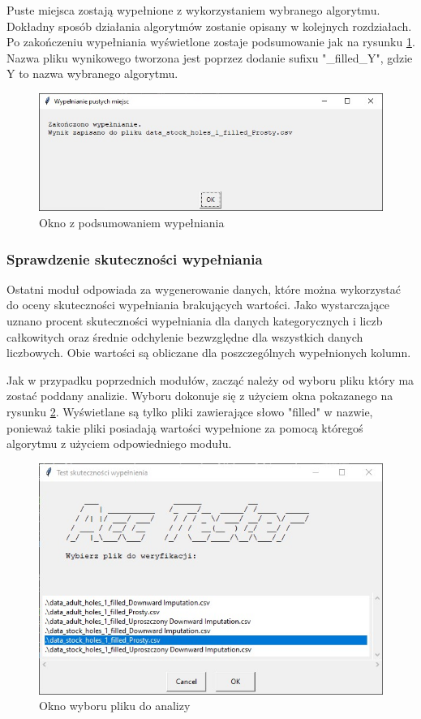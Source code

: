 \documentclass[12pt,twoside]{article}
\begin{document}
Puste miejsca zostają wypełnione z wykorzystaniem wybranego algorytmu.
Dokładny sposób działania algorytmów zostanie opisany w kolejnych rozdziałach.
Po zakończeniu wypełniania wyświetlone zostaje podsumowanie jak na rysunku \ref{Fig:fill_end}.
Nazwa pliku wynikowego tworzona jest poprzez dodanie sufixu "\_filled\_Y", gdzie Y to nazwa wybranego algorytmu.

\begin{figure}[ht]
	\centering
	\includegraphics[width=12cm]{img/07.jpg}
	\caption{Okno z podsumowaniem wypełniania}
\label{Fig:fill_end}
\end{figure}

\subsubsection{Sprawdzenie skuteczności wypełniania}

Ostatni moduł odpowiada za wygenerowanie danych,
które można wykorzystać do oceny skuteczności wypełniania brakujących wartości.
Jako wystarczające uznano procent skuteczności wypełniania dla danych kategorycznych i liczb całkowitych
oraz średnie odchylenie bezwzględne dla wszystkich danych liczbowych.
Obie wartości są obliczane dla poszczególnych wypełnionych kolumn.

Jak w przypadku poprzednich modułów, zacząć należy od wyboru pliku który ma zostać poddany analizie.
Wyboru dokonuje się z użyciem okna pokazanego na rysunku \ref{Fig:acc_file}.
Wyświetlane są tylko pliki zawierające słowo "filled" w nazwie, ponieważ takie pliki
posiadają wartości wypełnione za pomocą któregoś algorytmu z użyciem odpowiedniego modułu.

\begin{figure}[ht]
	\centering
	\includegraphics[width=12cm]{img/08.jpg}
	\caption{Okno wyboru pliku do analizy}
\label{Fig:acc_file}
\end{figure}
\end{document}
